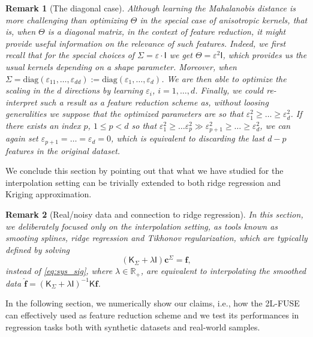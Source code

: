 \documentclass[hyphens,a4paper,11pt]{article}
\newtheorem{remark}{Remark}[section]
\newcommand{\mK}{\mathsf{K}}
\newcommand{\mI}{\mathsf{I}}
\newcommand{\mTheta}{\mathsf{\Theta}}
\newcommand{\mSigma}{\mathsf{\Sigma}}
\begin{document}
\begin{remark}[The diagonal case]
\label{diag}
    Although learning the Mahalanobis distance is more challenging than optimizing $\mTheta$ in the special case of anisotropic kernels, that is, when $\mTheta$ is a diagonal matrix, in the context of feature reduction, it might provide useful information on the relevance of such features. Indeed, we first recall that for the special choices of $\mSigma = \varepsilon \cdot \mI$ we get $\mTheta= \varepsilon^2 \mI $, which provides us the usual kernels depending on a shape parameter. Moreover, when $\mSigma = \mathrm{diag}(\varepsilon_{11}, \ldots, \varepsilon_{dd}):=\mathrm{diag}(\varepsilon_{1}, \ldots, \varepsilon_{d})$. We are then able to optimize the scaling in the $d$ directions by learning $\varepsilon_i$, $i=1,\ldots,d$. Finally, we could re-interpret such a result as a feature reduction scheme as, without loosing generalities we suppose that the optimized parameters are so that $\varepsilon_{1}^2 \geq \ldots \geq \varepsilon_{d}^2$. If there exists an index $p$, $1\leq p < d$ so that $\varepsilon_{1}^2 \geq \ldots \varepsilon_{p}^2 \gg \varepsilon_{p+1}^2 \geq \ldots \geq \varepsilon_{d}^2$, we can again set $\varepsilon_{p+1} = \ldots = \varepsilon_{d}=0$, which is equivalent to discarding the last $d-p$ features in the original dataset. 
\end{remark}

We conclude this section by pointing out that what we have studied for the interpolation setting can be trivially extended to both ridge regression and Kriging approximation.

\begin{remark}[Real/noisy data and connection to ridge regression] 
\label{remark_noise} In this section, we deliberately focused only on the interpolation setting, as  tools known as \emph{smooting splines, ridge regression} and \emph{Tikhonov regularization}, which are typically defined by solving \cite{Tikhonov,Wahba}
\begin{equation*}
    (\mK_{\mSigma} + \lambda \mI) \boldsymbol{c}^{\mSigma} = \boldsymbol{f}, 
\end{equation*}
instead of \eqref{eq:sys_sig}, where $\lambda \in \mathbb{R}_+$, are equivalent to interpolating  the \emph{smoothed} data  $\hat{\boldsymbol{f}}= (\mK_{\mSigma} + \lambda \mI)^{-1} \mK \boldsymbol{f}$.
\end{remark}

In the following section, we numerically show our claims, i.e., how the 2L-FUSE can effectively used as feature reduction scheme and we test its performances in regression tasks both with synthetic datasets and real-world samples. 
\end{document}
